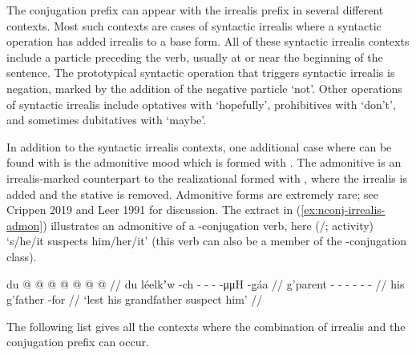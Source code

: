 \begin{multicols}{2}
\noindent
The  conjugation prefix can appear with the irrealis  prefix in several different contexts.
Most such contexts are cases of syntactic irrealis where a syntactic operation has added irrealis to a base form.
All of these syntactic irrealis contexts include a particle preceding the verb, usually at or near the beginning of the sentence.
The prototypical syntactic operation that triggers syntactic irrealis is negation, marked by the addition of the negative particle  ‘not’.
Other operations of syntactic irrealis include optatives with  ‘hopefully’, prohibitives with  ‘don’t’, and sometimes dubitatives with  ‘maybe’.

In addition to the syntactic irrealis contexts, one additional case where  can be found with  is the admonitive mood which is formed with .
The admonitive is an irrealis-marked counterpart to the realizational formed with , where the irrealis  is added and the stative  is removed.
Admonitive forms are extremely rare; see Crippen 2019 and Leer 1991 for discussion.
The extract in (\ref{ex:nconj-irrealis-admon}) illustrates an admonitive of a -conjugation verb, here  (/;  activity) ‘s/he/it suspects him/her/it’ (this verb can also be a member of the -conjugation class).

\ex\label{ex:nconj-irrealis-admon}%
%
\begingl
	\gla	du  @ {}  @ {} @ {} @ {} @ {} @ {} @ {} //
	\glb	du léelkʼw -ch - - -  -μμH {} -g̱áa //
	\glc	{} g’parent - - - -  - \· - //
	\gld	his g’father {}  {} {} {} {} {} {} -for //
	\glft	‘lest his grandfather suspect him’
		//
\endgl
\xe

The following list gives all the contexts where the combination of irrealis  and the  conjugation prefix can occur.


\end{multicols}
